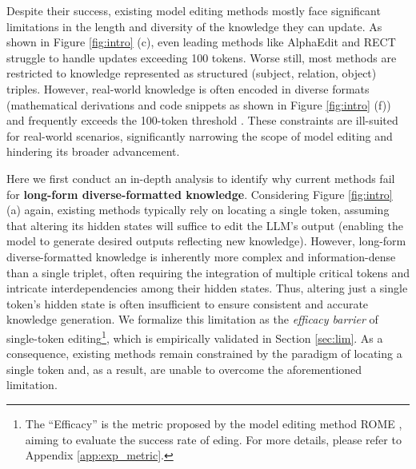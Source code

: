 Despite their success, existing model editing methods mostly face significant limitations in the length and diversity of the knowledge they can update. As shown in Figure \ref{fig:intro} (c), even leading methods like AlphaEdit \cite{AlphaEdit} and RECT \cite{RECT} struggle to handle updates exceeding 100 tokens. Worse still, most methods are restricted to knowledge represented as structured (subject, relation, object) triples. However, real-world knowledge is often encoded in diverse formats (\eg mathematical derivations and code snippets as shown in Figure \ref{fig:intro} (f)) and frequently exceeds the 100-token threshold \cite{AKEW}. These constraints are ill-suited for real-world scenarios, significantly narrowing the scope of model editing and hindering its broader advancement.

Here we first conduct an in-depth analysis to identify why current methods fail for \textbf{long-form diverse-formatted knowledge}. Considering Figure \ref{fig:intro} (a) again, existing methods typically rely on locating a single token, assuming that altering its hidden states will suffice to edit the LLM’s output (\ie enabling the model to generate desired outputs reflecting new knowledge). However, long-form diverse-formatted knowledge is inherently more complex and information-dense than a single triplet, often requiring the integration of multiple critical tokens and intricate interdependencies among their hidden states. Thus, altering just a single token's hidden state is often insufficient to ensure consistent and accurate knowledge generation. We formalize this limitation as the \textit{efficacy barrier} of single-token editing\footnote{The ``Efficacy'' is the metric proposed by the model editing method ROME \cite{ROME},  aiming to evaluate the success rate of eding. For more details, please refer to Appendix \ref{app:exp_metric}.}, which is empirically validated in Section \ref{sec:lim}. As a consequence, existing methods remain constrained by the paradigm of locating a single token and, as a result, are unable to overcome the aforementioned limitation.


